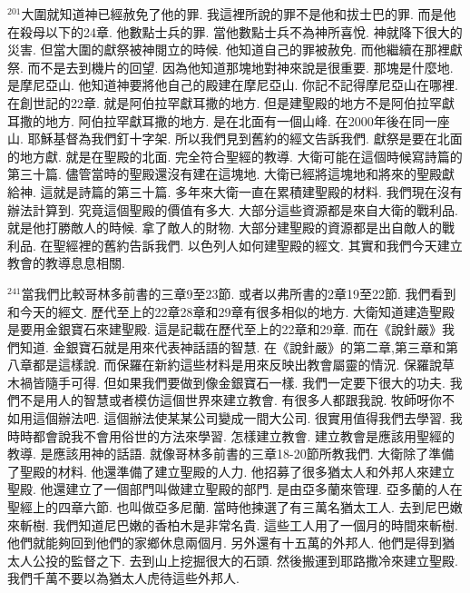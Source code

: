 \documentclass{book}
\begin{document}
$^{201}$大圍就知道神已經赦免了他的罪.
我這裡所說的罪不是他和拔士巴的罪.
而是他在殺母以下的24章.
他數點士兵的罪.
當他數點士兵不為神所喜悅.
神就降下很大的災害.
但當大圍的獻祭被神閱立的時候.
他知道自己的罪被赦免.
而他繼續在那裡獻祭.
而不是去到機片的回望.
因為他知道那塊地對神來說是很重要.
那塊是什麼地.
是摩尼亞山.
他知道神要將他自己的殿建在摩尼亞山.
你記不記得摩尼亞山在哪裡.
在創世記的22章.
就是阿伯拉罕獻耳撒的地方.
但是建聖殿的地方不是阿伯拉罕獻耳撒的地方.
阿伯拉罕獻耳撒的地方.
是在北面有一個山峰.
在2000年後在同一座山.
耶穌基督為我們釘十字架.
所以我們見到舊約的經文告訴我們.
獻祭是要在北面的地方獻.
就是在聖殿的北面.
完全符合聖經的教導.
大衛可能在這個時候寫詩篇的第三十篇.
儘管當時的聖殿還沒有建在這塊地.
大衛已經將這塊地和將來的聖殿獻給神.
這就是詩篇的第三十篇.
多年來大衛一直在累積建聖殿的材料.
我們現在沒有辦法計算到.
究竟這個聖殿的價值有多大.
大部分這些資源都是來自大衛的戰利品.
就是他打勝敵人的時候.
拿了敵人的財物.
大部分建聖殿的資源都是出自敵人的戰利品.
在聖經裡的舊約告訴我們.
以色列人如何建聖殿的經文.
其實和我們今天建立教會的教導息息相關.

$^{241}$當我們比較哥林多前書的三章9至23節.
或者以弗所書的2章19至22節.
我們看到和今天的經文.
歷代至上的22章28章和29章有很多相似的地方.
大衛知道建造聖殿是要用金銀寶石來建聖殿.
這是記載在歷代至上的22章和29章.
而在《說針嚴》我們知道.
金銀寶石就是用來代表神話語的智慧.
在《說針嚴》的第二章,第三章和第八章都是這樣說.
而保羅在新約這些材料是用來反映出教會屬靈的情況.
保羅說草木禍皆隨手可得.
但如果我們要做到像金銀寶石一樣.
我們一定要下很大的功夫.
我們不是用人的智慧或者模仿這個世界來建立教會.
有很多人都跟我說.
牧師呀你不如用這個辦法吧.
這個辦法使某某公司變成一間大公司.
很實用值得我們去學習.
我時時都會說我不會用俗世的方法來學習.
怎樣建立教會.
建立教會是應該用聖經的教導.
是應該用神的話語.
就像哥林多前書的三章18-20節所教我們.
大衛除了準備了聖殿的材料.
他還準備了建立聖殿的人力.
他招募了很多猶太人和外邦人來建立聖殿.
他還建立了一個部門叫做建立聖殿的部門.
是由亞多蘭來管理.
亞多蘭的人在聖經上的四章六節.
也叫做亞多尼蘭.
當時他揀選了有三萬名猶太工人.
去到尼巴嫩來斬樹.
我們知道尼巴嫩的香柏木是非常名貴.
這些工人用了一個月的時間來斬樹.
他們就能夠回到他們的家鄉休息兩個月.
另外還有十五萬的外邦人.
他們是得到猶太人公投的監督之下.
去到山上挖掘很大的石頭.
然後搬運到耶路撒冷來建立聖殿.
我們千萬不要以為猶太人虎待這些外邦人.
\end{document}
